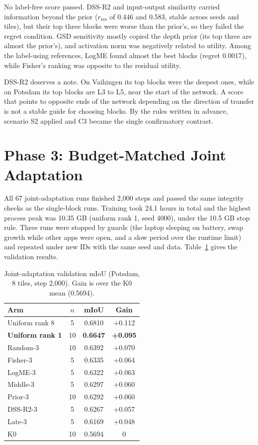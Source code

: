 \documentclass[11pt,a4paper]{report}
\begin{document}
No label-free score passed. DSS-R2 and input-output similarity carried information beyond the prior ($r_{\text{res}}$ of 0.446 and 0.583, stable across seeds and tiles), but their top three blocks were worse than the prior's, so they failed the regret condition. GSD sensitivity mostly copied the depth prior (its top three are almost the prior's), and activation norm was negatively related to utility. Among the label-using references, LogME found almost the best blocks (regret 0.0017), while Fisher's ranking was opposite to the residual utility.

DSS-R2 deserves a note. On Vaihingen its top blocks were the deepest ones, while on Potsdam its top blocks are L3 to L5, near the start of the network. A score that points to opposite ends of the network depending on the direction of transfer is not a stable guide for choosing blocks. By the rules written in advance, scenario S2 applied and C3 became the single confirmatory contrast.

\section{Phase 3: Budget-Matched Joint Adaptation}

All 67 joint-adaptation runs finished 2,000 steps and passed the same integrity checks as the single-block runs. Training took 24.1 hours in total and the highest process peak was 10.35 GB (uniform rank 1, seed 4000), under the 10.5 GB stop rule. Three runs were stopped by guards (the laptop sleeping on battery, swap growth while other apps were open, and a slow period over the runtime limit) and repeated under new IDs with the same seed and data. Table~\ref{tab:stagedval} gives the validation results.

\begin{table}[t]
\centering
\caption{Joint-adaptation validation mIoU (Potsdam, 8 tiles, step 2,000). Gain is over the K0 mean (0.5694).}
\label{tab:stagedval}
\small
\setlength{\tabcolsep}{4pt}
\begin{tabular}{@{}lccc@{}}
\toprule
\textbf{Arm} & \textbf{$n$} & \textbf{mIoU} & \textbf{Gain} \\
\midrule
Uniform rank 8 & 5 & 0.6810 & +0.112 \\
\textbf{Uniform rank 1} & 10 & \textbf{0.6647} & \textbf{+0.095} \\
Random-3 & 10 & 0.6392 & +0.070 \\
Fisher-3 & 5 & 0.6335 & +0.064 \\
LogME-3 & 5 & 0.6322 & +0.063 \\
Middle-3 & 5 & 0.6297 & +0.060 \\
Prior-3 & 10 & 0.6292 & +0.060 \\
DSS-R2-3 & 5 & 0.6267 & +0.057 \\
Late-3 & 5 & 0.6169 & +0.048 \\
K0 & 10 & 0.5694 & 0 \\
\bottomrule
\end{tabular}
\end{table}
\end{document}
